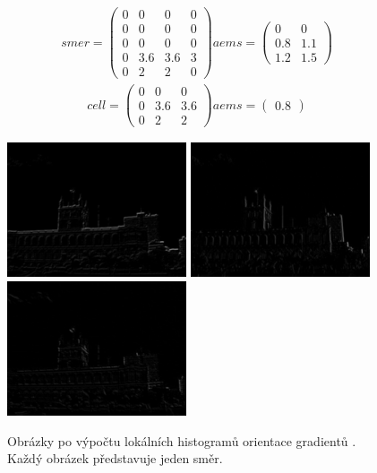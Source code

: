 \documentclass{report}
\begin{document}
\begin{align}
	\label{aems}
		smer = \begin{pmatrix}0 & 0 & 0 & 0 \\ 0 & 0 & 0 & 0 \\0 & 0 & 0 & 0 \\ 0 & 3.6 & 3.6 & 3 \\ 0 & 2 & 2 & 0 \end{pmatrix}
		aems = \begin{pmatrix}0 & 0 \\ 0.8 & 1.1 \\ 1.2 & 1.5 \end{pmatrix}
		\tag{Ukázka výpočtu u jednoho směru při velikosti cell 3}
\end{align}
\begin{align}
	\label{aems_detail}
		cell = \begin{pmatrix}0 & 0 & 0 \\ 0 & 3.6 & 3.6 \\ 0 & 2 & 2 \end{pmatrix}
		aems = \begin{pmatrix}0.8 \end{pmatrix}
		\tag{Ukázka výpočtu pro jeden pixel při velikosti cell 3}
\end{align}

\begin{figure}[H]
	\centering
	\includegraphics[width=150pt]{./img/aems0.png}
	\includegraphics[width=150pt]{./img/aems1.png}
	\includegraphics[width=150pt]{./img/aems2.png}
	\caption{Obrázky po výpočtu lokálních histogramů orientace gradientů . Každý obrázek představuje jeden směr.}
\end{figure}
\end{document}
